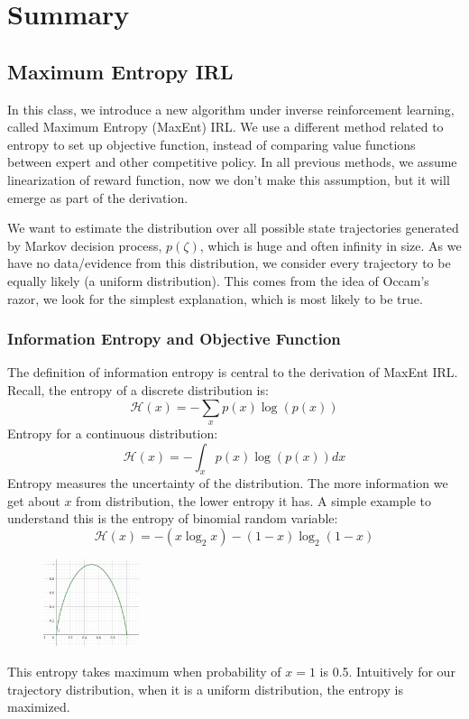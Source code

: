 \documentclass[11pt]{article}
\begin{document}
\clearpage
\section{Summary}
\subsection{Maximum Entropy IRL}
In this class, we introduce a new algorithm under inverse reinforcement learning, called Maximum Entropy (MaxEnt) IRL. We use a different method related to entropy to set up objective function, instead of comparing value functions between expert and other competitive policy. In all previous methods, we assume linearization of reward function, now we don't make this assumption, but it will emerge as part of the derivation.

We want to estimate the distribution over all possible state trajectories generated by Markov decision process, $p(\zeta)$, which is huge and often infinity in size. As we have no data/evidence from this distribution, we consider every trajectory to be equally likely (a uniform distribution). This comes from the idea of Occam's razor, we look for the simplest explanation, which is most likely to be true.

\subsubsection{Information Entropy and Objective Function}
The definition of information entropy is central to the derivation of MaxEnt IRL. Recall, the entropy of a discrete distribution is:
\[ \mathcal{H}(x) = -\sum_x p(x) \log(p(x)) \]
Entropy for a continuous distribution:
\[ \mathcal{H}(x) = -\int_x p(x) \log(p(x)) dx \]
Entropy measures the uncertainty of the distribution. The more information we get about $x$ from distribution, the lower entropy it has. A simple example to understand this is the entropy of binomial random variable:
\[ \mathcal{H}(x) = -(x \log_2x) - (1-x) \log_2(1-x) \]
\begin{figure}[H]
    \centering
    \includegraphics[width=0.25\textwidth]{pic-s3/binary_entropy_function.png}
\end{figure}
This entropy takes maximum when probability of $x=1$ is 0.5. Intuitively for our trajectory distribution, when it is a uniform distribution, the entropy is maximized.
\end{document}
